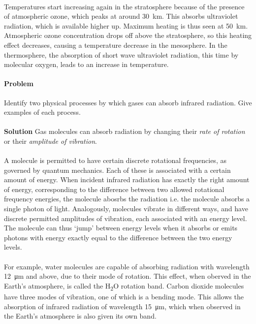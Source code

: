 \documentclass[10pt]{article}
\newcounter{prob}
\def\problem{\stepcounter{prob}\paragraph{Problem \arabic{prob}}}
\def\solution{\\\\\textbf{Solution }}
\begin{document}
        \paragraph{}
        Temperatures start increasing again in the stratosphere because of the presence of atmospheric ozone, which peaks at around
        \SI{30}{\kilo\metre}. This absorbs ultraviolet radiation, which is available higher up. Maximum heating is thus seen at
        \SI{50}{\kilo\metre}. Atmospheric ozone concentration drops off above the stratosphere, so this heating effect decreases, causing
        a temperature decrease in the mesosphere. In the thermosphere, the absorption of short wave ultraviolet radiation, this time
        by molecular oxygen, leads to an increase in temperature.
        
        \problem Identify two physical processes by which gases can absorb infrared radiation. Give examples of each process.
        \solution Gas molecules can absorb radiation by changing their {\it rate of rotation} or their {\it amplitude of vibration}.
        \paragraph{}
        A molecule is permitted to have certain discrete rotational frequencies, as governed by quantum mechanics. Each of these is
        associated with a certain amount of energy. When incident infrared radiation has exactly the right amount of energy,
        corresponding to the difference between two allowed rotational frequency energies, the molecule abosrbs the radiation
        i.e. the molecule absorbs a single photon of light.
        Analogously, molecules vibrate in different ways, and have discrete permitted amplitudes of vibration, each associated with 
        an energy level. The molecule can thus `jump' between energy levels when it absorbs or emits photons with energy exactly equal
        to the difference between the two energy levels.
        \paragraph{}
        For example, water molecules are capable of absorbing radiation with wavelength \SI{12}{\micro\metre} and above, due
        to their mode of rotation. This effect, when oberved in the Earth's atmosphere, is called the H\textsubscript{2}O rotation band.
        Carbon dioxide molecules have three modes of vibration, one of which is a bending mode. This allows the absorption of
        infrared radiation of wavelength \SI{15}{\micro\metre}, which when observed in the Earth's atmosphere is also given its own band.
\end{document}
